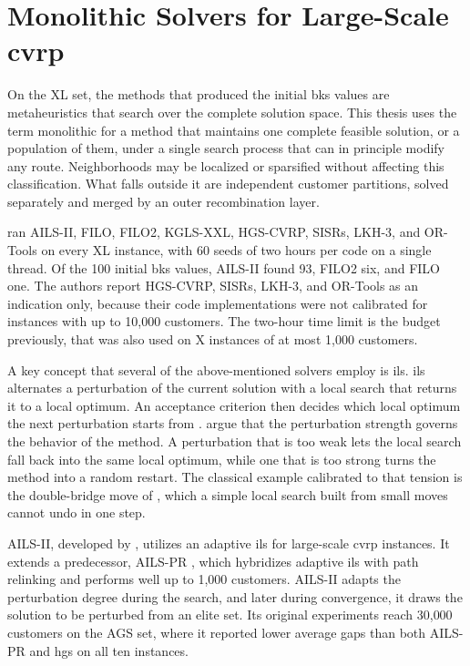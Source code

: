 \section[Monolithic Solvers for Large-Scale CVRP]{\texorpdfstring{Monolithic Solvers for Large-Scale \gls{cvrp}}{Monolithic Solvers for Large-Scale CVRP}}\label{sec:lit-large-cvrp}

On the XL set, the methods that produced the initial \gls{bks} values are metaheuristics that search over the complete solution space. This thesis uses the term monolithic for a method that maintains one complete feasible solution, or a population of them, under a single search process that can in principle modify any route. Neighborhoods may be localized or sparsified without affecting this classification. What falls outside it are independent customer partitions, solved separately and merged by an outer recombination layer.

\citet{queirogaXLInstancesCapacitated2026} ran AILS-II, FILO, FILO2, KGLS-XXL, HGS-CVRP, SISRs, LKH-3, and OR-Tools on every XL instance, with 60 seeds of two hours per code on a single thread. Of the 100 initial \gls{bks} values, AILS-II found 93, FILO2 six, and FILO one. The authors report HGS-CVRP, SISRs, LKH-3, and OR-Tools as an indication only, because their code implementations were not calibrated for instances with up to 10{,}000 customers. The two-hour time limit is the budget previously, that was also used on X instances of at most 1{,}000 customers.

A key concept that several of the above-mentioned solvers employ is \gls{ils}. \gls{ils} alternates a perturbation of the current solution with a local search that returns it to a local optimum. An acceptance criterion then decides which local optimum the next perturbation starts from \citep{lourencoIteratedLocalSearch2003}. \citet{lourencoIteratedLocalSearch2003} argue that the perturbation strength governs the behavior of the method. A perturbation that is too weak lets the local search fall back into the same local optimum, while one that is too strong turns the method into a random restart. The classical example calibrated to that tension is the double-bridge move of \citet{martinLargestepMarkovChains1991}, which a simple local search built from small moves cannot undo in one step.

AILS-II, developed by \citet{maximoAILSIIAdaptiveIterated2024}, utilizes an adaptive \gls{ils} for large-scale \gls{cvrp} instances. It extends a predecessor, AILS-PR \citep{maximoHybridAdaptiveIterated2021}, which hybridizes adaptive \gls{ils} with path relinking and performs well up to 1{,}000 customers. AILS-II adapts the perturbation degree during the search, and later during convergence, it draws the solution to be perturbed from an elite set. Its original experiments reach 30{,}000 customers on the AGS set, where it reported lower average gaps than both AILS-PR and \gls{hgs} on all ten instances.


